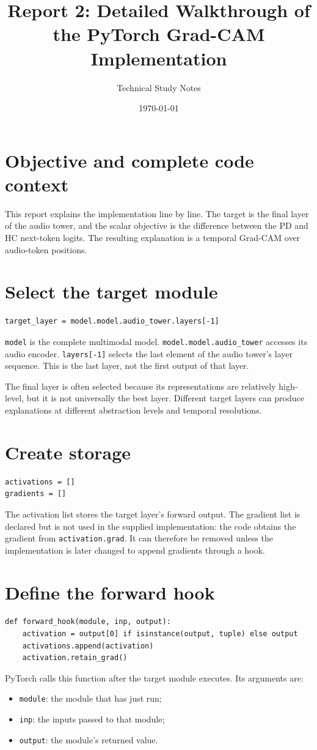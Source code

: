 \documentclass[11pt,a4paper]{article}
\title{Report 2: Detailed Walkthrough of the PyTorch Grad-CAM Implementation}
\author{Technical Study Notes}
\date{\today}
\begin{document}
\maketitle
\tableofcontents
\newpage
\section{Objective and complete code context}
This report explains the implementation line by line. The target is the final layer of the audio tower, and the scalar objective is the difference between the PD and HC next-token logits. The resulting explanation is a temporal Grad-CAM over audio-token positions.

\section{Select the target module}
\begin{lstlisting}[style=python]
target_layer = model.model.audio_tower.layers[-1]
\end{lstlisting}
\texttt{model} is the complete multimodal model. \texttt{model.model.audio\_tower} accesses its audio encoder. \texttt{layers[-1]} selects the last element of the audio tower's layer sequence. This is the last layer, not the first output of that layer.

The final layer is often selected because its representations are relatively high-level, but it is not universally the best layer. Different target layers can produce explanations at different abstraction levels and temporal resolutions.

\section{Create storage}
\begin{lstlisting}[style=python]
activations = []
gradients = []
\end{lstlisting}
The activation list stores the target layer's forward output. The gradient list is declared but is not used in the supplied implementation: the code obtains the gradient from \texttt{activation.grad}. It can therefore be removed unless the implementation is later changed to append gradients through a hook.

\section{Define the forward hook}
\begin{lstlisting}[style=python]
def forward_hook(module, inp, output):
    activation = output[0] if isinstance(output, tuple) else output
    activations.append(activation)
    activation.retain_grad()
\end{lstlisting}
PyTorch calls this function after the target module executes. Its arguments are:
\begin{itemize}
\item \texttt{module}: the module that has just run;
\item \texttt{inp}: the inputs passed to that module;
\item \texttt{output}: the module's returned value.
\end{itemize}
\end{document}

